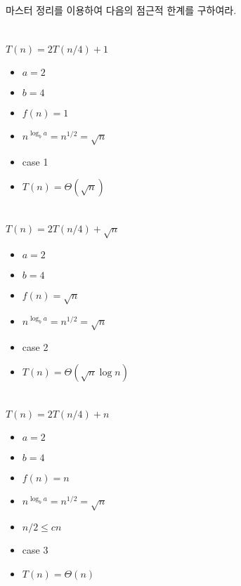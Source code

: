 \documentclass{oblivoir}
\begin{document}
    
\begin{multicols}{2}


마스터 정리를 이용하여 다음의 점근적 한계를 구하여라.

\section{}

$T(n) = 2T(n/4) + 1$

\begin{itemize}
    \item $a = 2$
    \item $b = 4$
    \item $f(n) = 1$
    \item $n^{\log_b a} = n^{1/2} = \sqrt{n}$
    \item case 1
    \item $T(n) = \Theta(\sqrt{n})$
\end{itemize}



\section{}

$T(n) = 2T(n/4) + \sqrt{n}$

\begin{itemize}
    \item $a = 2$
    \item $b = 4$
    \item $f(n) = \sqrt{n}$
    \item $n^{\log_b a} = n^{1/2} = \sqrt{n}$ 
    \item case 2
    \item $T(n) = \Theta(\sqrt{n}\log n)$
\end{itemize}


\section{}

$T(n) = 2T(n/4) + n$

\begin{itemize}
    \item $a = 2$
    \item $b = 4$
    \item $f(n) = n$
    \item $n^{\log_b a} = n^{1/2} = \sqrt{n}$
    \item $n/2 \le cn$
    \item case 3
    \item $T(n) = \Theta(n)$
\end{itemize}



\end{multicols}
\end{document}
